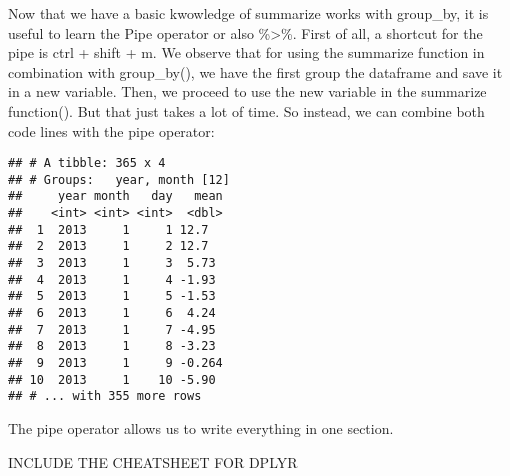 \documentclass[
]{article}
\newenvironment{Shaded}{\begin{snugshade}}{\end{snugshade}}
\newcommand{\DataTypeTok}[1]{\textcolor[rgb]{0.13,0.29,0.53}{#1}}
\newcommand{\KeywordTok}[1]{\textcolor[rgb]{0.13,0.29,0.53}{\textbf{#1}}}
\newcommand{\NormalTok}[1]{#1}
\newcommand{\OperatorTok}[1]{\textcolor[rgb]{0.81,0.36,0.00}{\textbf{#1}}}
\newcommand{\OtherTok}[1]{\textcolor[rgb]{0.56,0.35,0.01}{#1}}
\newcommand{\StringTok}[1]{\textcolor[rgb]{0.31,0.60,0.02}{#1}}
\begin{document}
Now that we have a basic kwowledge of summarize works with group\_by, it
is useful to learn the Pipe operator or also \%\textgreater\%. First of
all, a shortcut for the pipe is ctrl + shift + m. We observe that for
using the summarize function in combination with group\_by(), we have
the first group the dataframe and save it in a new variable. Then, we
proceed to use the new variable in the summarize function(). But that
just takes a lot of time. So instead, we can combine both code lines
with the pipe operator:

\begin{Shaded}
\end{Shaded}

\begin{verbatim}
## # A tibble: 365 x 4
## # Groups:   year, month [12]
##     year month   day   mean
##    <int> <int> <int>  <dbl>
##  1  2013     1     1 12.7  
##  2  2013     1     2 12.7  
##  3  2013     1     3  5.73 
##  4  2013     1     4 -1.93 
##  5  2013     1     5 -1.53 
##  6  2013     1     6  4.24 
##  7  2013     1     7 -4.95 
##  8  2013     1     8 -3.23 
##  9  2013     1     9 -0.264
## 10  2013     1    10 -5.90 
## # ... with 355 more rows
\end{verbatim}

The pipe operator allows us to write everything in one section.

INCLUDE THE CHEATSHEET FOR DPLYR
\end{document}
